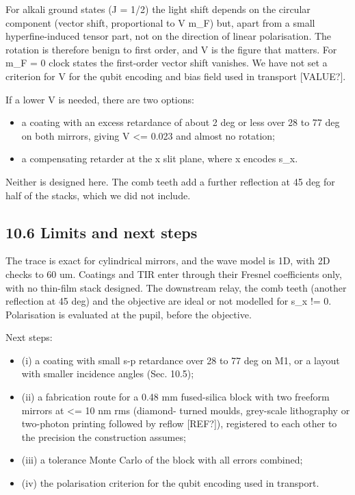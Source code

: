For alkali ground states (J = 1/2) the light shift depends on the
circular component (vector shift, proportional to V m\_F) but, apart
from a small hyperfine-induced tensor part, not on the direction of
linear polarisation. The rotation is therefore benign to first order,
and V is the figure that matters. For m\_F = 0 clock states the
first-order vector shift vanishes. We have not set a criterion for V for
the qubit encoding and bias field used in transport {[}VALUE?{]}.

If a lower V is needed, there are two options:

\begin{itemize}
\tightlist
\item
  a coating with an excess retardance of about 2 deg or less over 28 to
  77 deg on both mirrors, giving \textbar V\textbar{} \textless= 0.023
  and almost no rotation;
\item
  a compensating retarder at the x slit plane, where x encodes s\_x.
\end{itemize}

Neither is designed here. The comb teeth add a further reflection at 45
deg for half of the stacks, which we did not include.

\hypertarget{106-limits-and-next-steps}{%
\subsection{10.6 Limits and next
steps}\label{collimator-106-limits-and-next-steps}}

The trace is exact for cylindrical mirrors, and the wave model is 1D,
with 2D checks to 60 um. Coatings and TIR enter through their Fresnel
coefficients only, with no thin-film stack designed. The downstream
relay, the comb teeth (another reflection at 45 deg) and the objective
are ideal or not modelled for s\_x != 0. Polarisation is evaluated at
the pupil, before the objective.

Next steps:

\begin{itemize}
\tightlist
\item
  (i) a coating with small s-p retardance over 28 to 77 deg on M1, or a
  layout with smaller incidence angles (Sec. 10.5);
\item
  (ii) a fabrication route for a 0.48 mm fused-silica block with two
  freeform mirrors at \textless= 10 nm rms (diamond- turned moulds,
  grey-scale lithography or two-photon printing followed by reflow
  {[}REF?{]}), registered to each other to the precision the
  construction assumes;
\item
  (iii) a tolerance Monte Carlo of the block with all errors combined;
\item
  (iv) the polarisation criterion for the qubit encoding used in
  transport.
\end{itemize}


